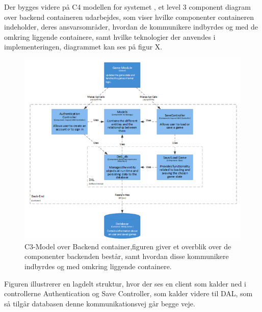 Der bygges videre på C4 modellen for systemet , et level 3 component diagram over backend containeren udarbejdes, som viser hvilke componenter containeren indeholder, deres ansvarsområder, hvordan de kommunikere indbyrdes og med de omkring liggende containere, samt hvilke teknologier der anvendes i implementeringen, diagrammet kan ses på figur X. 


\begin{figure}[H]
\centering
\includegraphics[width = \textwidth]{02-Body/Images/Backend_C3.PNG}
\caption{C3-Model over Backend container,figuren giver et overblik over de componenter backenden består, samt hvordan disse kommunikere indbyrdes og med omkring liggende containere.}
\label{fig:Arkitektur-Backend-C3}
\end{figure}

Figuren illustrerer en lagdelt struktur, hvor der ses en client som kalder ned i controllerne Authentication og Save Controller, som kalder videre til DAL, som så tilgår databasen denne kommunikationsvej går begge veje.

